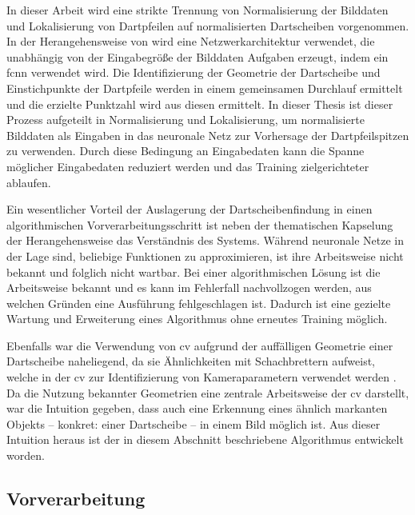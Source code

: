 In dieser Arbeit wird eine strikte Trennung von Normalisierung der Bilddaten und Lokalisierung von Dartpfeilen auf normalisierten Dartscheiben vorgenommen. In der Herangehensweise von \citeauthor{deepdarts} wird eine Netzwerkarchitektur verwendet, die unabhängig von der Eingabegröße der Bilddaten Aufgaben erzeugt, indem ein \ac{fcnn} verwendet wird. Die Identifizierung der Geometrie der Dartscheibe und Einstichpunkte der Dartpfeile werden in einem gemeinsamen Durchlauf ermittelt und die erzielte Punktzahl wird aus diesen ermittelt. In dieser Thesis ist dieser Prozess aufgeteilt in Normalisierung und Lokalisierung, um normalisierte Bilddaten als Eingaben in das neuronale Netz zur Vorhersage der Dartpfeilspitzen zu verwenden. Durch diese Bedingung an Eingabedaten kann die Spanne möglicher Eingabedaten reduziert werden und das Training zielgerichteter ablaufen.

Ein wesentlicher Vorteil der Auslagerung der Dartscheibenfindung in einen algorithmischen Vorverarbeitungsschritt ist neben der thematischen Kapselung der Herangehensweise das Verständnis des Systems. Während neuronale Netze in der Lage sind, beliebige Funktionen zu approximieren, ist ihre Arbeitsweise nicht bekannt und folglich nicht wartbar. Bei einer algorithmischen Lösung ist die Arbeitsweise bekannt und es kann im Fehlerfall nachvollzogen werden, aus welchen Gründen eine Ausführung fehlgeschlagen ist. Dadurch ist eine gezielte Wartung und Erweiterung eines Algorithmus ohne erneutes Training möglich.

Ebenfalls war die Verwendung von \ac{cv} aufgrund der auffälligen Geometrie einer Dartscheibe naheliegend, da sie Ähnlichkeiten mit Schachbrettern aufweist, welche in der \ac{cv} zur Identifizierung von Kameraparametern verwendet werden \cite{cv_general}. Da die Nutzung bekannter Geometrien eine zentrale Arbeitsweise der \ac{cv} darstellt, war die Intuition gegeben, dass auch eine Erkennung eines ähnlich markanten Objekts -- konkret: einer Dartscheibe -- in einem Bild möglich ist. Aus dieser Intuition heraus ist der in diesem Abschnitt beschriebene Algorithmus entwickelt worden.


\subsection{Vorverarbeitung}
\label{sec:vorverarbeitung}

